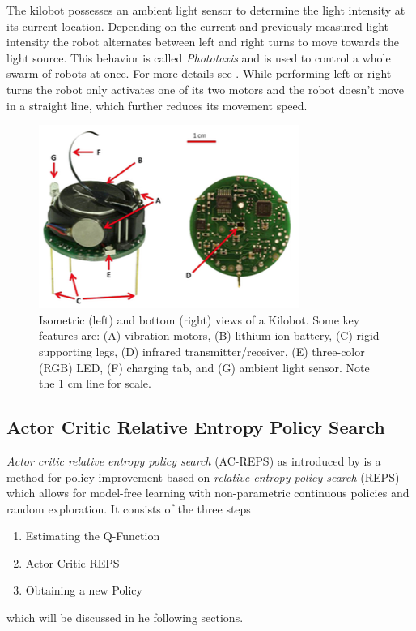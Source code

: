 \documentclass[twoside]{article}
\begin{document}
The kilobot possesses an ambient light sensor to determine the light
intensity at its current location. Depending on the current and previously
measured light intensity the robot alternates between left and right turns to
move towards the light source. This behavior is called
\emph{Phototaxis} and is used to control a whole swarm of robots at once. For
more details see \cite{kilobotMaze}. While performing left or right
turns the robot only activates one of its two motors and the robot doesn't move
in a straight line, which further reduces its movement speed.

\begin{figure}[!htb]
    \centering
    \includegraphics[width=0.9\linewidth]{figures/kilobot.png}
    \caption{Isometric (left) and bottom (right) views of a Kilobot. Some key
        features are: (A) vibration motors, (B) lithium-ion battery, (C) rigid
        supporting legs, (D) infrared transmitter/receiver, (E) three-color
        (RGB) LED, (F) charging tab, and (G) ambient light sensor. Note the 1 cm
        line for scale.\cite{kilobot}}
\end{figure}

\subsection{Actor Critic Relative Entropy Policy Search}
\emph{Actor critic relative entropy policy search} (AC-REPS) as introduced by
\cite{acreps} is a method for policy improvement based on \emph{relative entropy
policy search} (REPS) \cite{reps} which allows for model-free learning with
non-parametric continuous policies and random exploration. It consists of the
three steps
\begin{enumerate}
    \item Estimating the Q-Function
    \item Actor Critic REPS
    \item Obtaining a new Policy
\end{enumerate}
which will be discussed in he following sections.
\end{document}
